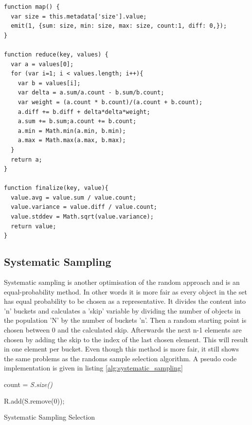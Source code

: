 \begin{lstlisting}[caption={The Map, Reduce and Finalize functions for basic statistical aggregations.}, label={lst:map_reduce}]
function map() {
  var size = this.metadata['size'].value;
  emit(1, {sum: size, min: size, max: size, count:1, diff: 0,});
}

function reduce(key, values) {
  var a = values[0];
  for (var i=1; i < values.length; i++){
    var b = values[i];
    var delta = a.sum/a.count - b.sum/b.count;
    var weight = (a.count * b.count)/(a.count + b.count);
    a.diff += b.diff + delta*delta*weight;
    a.sum += b.sum;a.count += b.count;
    a.min = Math.min(a.min, b.min);
    a.max = Math.max(a.max, b.max);
  }
  return a;
}

function finalize(key, value){
  value.avg = value.sum / value.count;
  value.variance = value.diff / value.count;
  value.stddev = Math.sqrt(value.variance);
  return value;
}
\end{lstlisting}

\subsection{Systematic Sampling}
Systematic sampling is another optimisation of the random approach and is an equal-probability method. In other words it is more fair as every object in the set has equal probability to be chosen as a representative. It divides the content into 'n' buckets and calculates a 'skip' variable by dividing the number of objects in the population 'N' by the number of buckets 'n'. Then a random starting point is chosen between 0 and the calculated skip. Afterwards the next n-1 elements are chosen by adding the skip to the index of the last chosen element.  This will result in one element per bucket.
Even though this method is more fair, it still shows the same problems as the randoms sample selection algorithm. A pseudo code implementation is given in listing \ref{alg:systematic_sampling}

\begin{algorithm}[!htb]
\SetAlgoLined
{}

 \BlankLine

count = \textit{S.size()}\; 
 
  {
    {  
   	R.add(S.remove(0));
   }
 }
 \caption{Systematic Sampling Selection}
 \label{alg:systematic_sampling}
\end{algorithm}

